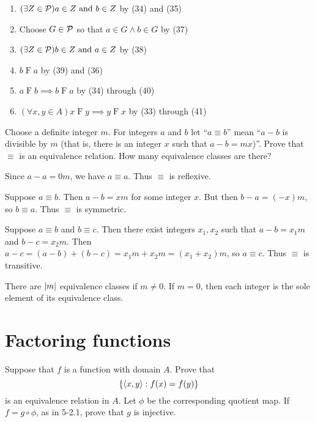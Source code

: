 \begin{solution}
\begin{enumerate}[label=(\arabic*)]
    \item \quad\quad $(\exists Z\in\mathcal{P})a\in Z\text{ and } b\in Z$ \hfill by (34) and (35)
    \item \quad\quad Choose $G\in\mathcal{P}$ so that $a\in G\land b\in G$ \hfill by (37)
    \item \quad\quad $(\exists Z\in\mathcal{P})b\in Z\text{ and } a\in Z$ \hfill by (38)
    \item \quad\quad $b\mathrel F a$ \hfill by (39) and (36)
    \item \quad $a\mathrel F b \implies b\mathrel F a$ \hfill by (34) through (40)
    \item $(\forall x, y\in A)x\mathrel F y \implies y \mathrel F x$ \hfill by (33) through (41)
\end{enumerate}
\end{solution}

\begin{exercise}
Choose a definite integer $m$. For integers $a$ and $b$ let ``$a\equiv b$'' mean
``$a - b$ is divisible by $m$ (that is, there is an integer $x$ such that $a-b=mx$)''.
Prove that $\equiv$ is an equivalence relation. How many equivalence classes are there?
\end{exercise}

\begin{solution}
Since $a-a=0m$, we have $a\equiv a$. Thus $\equiv$ is reflexive.

Suppose $a\equiv b$. Then $a-b=xm$ for some integer $x$. But then $b-a=(-x)m$,
so $b\equiv a$. Thus $\equiv$ is symmetric.

Suppose $a\equiv b$ and $b\equiv c$. Then there exist integers $x_1,x_2$ such that
$a-b=x_1m$ and $b-c=x_2m$.
Then $a-c=(a-b)+(b-c)=x_1m+x_2m=(x_1+x_2)m$, so $a\equiv c$. Thus $\equiv$ is transitive.

There are $\left\lvert m\right\rvert$ equivalence classes if $m\neq 0$. If $m=0$, then each integer is
the sole element of its equivalence class.
\end{solution}
\section{Factoring functions}

\begin{exercise}
Suppose that $f$ is a function with domain $A$. Prove that
\[\left\{ \left\langle x,y\right\rangle : f(x)=f(y) \right\}\]
is an equivalence relation in $A$. Let $\phi$ be the corresponding quotient map.
If $f = g\circ \phi$,
as in 5-2.1, prove that $g$ is injective.
\end{exercise}

